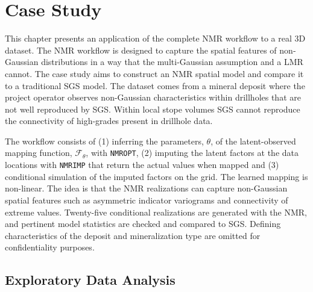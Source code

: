 
\chapter{Case Study}
\label{ch:06casestudy}

This chapter presents an application of the complete \gls{NMR} workflow to a real \gls{3D} dataset. The \gls{NMR} workflow is designed to capture the spatial features of non‐Gaussian distributions in a way that the multi-Gaussian assumption and a \gls{LMR} cannot. The case study aims to construct an \gls{NMR} spatial model and compare it to a traditional \gls{SGS} model. The dataset comes from a mineral deposit where the project operator observes non-Gaussian characteristics within drillholes that are not well reproduced by \gls{SGS}. Within local stope volumes \gls{SGS} cannot reproduce the connectivity of high-grades present in drillhole data.

The workflow consists of (1) inferring the parameters, $\theta$, of the latent-observed mapping function, $\mathcal{F}_{\theta}$, with \texttt{NMROPT}, (2) imputing the latent factors at the data locations with \texttt{NMRIMP} that return the actual values when mapped and (3) conditional simulation of the imputed factors on the grid. The learned mapping is non-linear. The idea is that the \gls{NMR} realizations can capture non-Gaussian spatial features such as asymmetric indicator variograms and connectivity of extreme values. Twenty-five conditional realizations are generated with the \gls{NMR}, and pertinent model statistics are checked and compared to \gls{SGS}. Defining characteristics of the deposit and mineralization type are omitted for confidentiality purposes.

\FloatBarrier
\section{Exploratory Data Analysis}
\label{sec:06eda}

